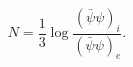 \begin{equation}
  N=\frac{1}{3}\log \frac{(\bar{\psi}{\psi})_i}{(\bar{\psi}{\psi})_e}.
\end{equation}

